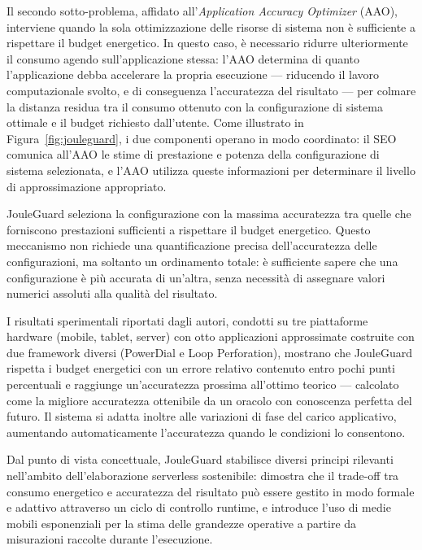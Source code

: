 Il secondo sotto-problema, affidato all'\emph{Application Accuracy
Optimizer} (AAO), interviene quando la sola ottimizzazione delle risorse
di sistema non è sufficiente a rispettare il budget energetico. In
questo caso, è necessario ridurre ulteriormente il consumo agendo
sull'applicazione stessa: l'AAO determina di quanto l'applicazione
debba accelerare la propria esecuzione --- riducendo il lavoro
computazionale svolto, e di conseguenza l'accuratezza del risultato ---
per colmare la distanza residua tra il consumo ottenuto con la
configurazione di sistema ottimale e il budget richiesto dall'utente.
Come illustrato in Figura~\ref{fig:jouleguard}, i due componenti
operano in modo coordinato: il SEO comunica all'AAO le stime di
prestazione e potenza della configurazione di sistema selezionata, e
l'AAO utilizza queste informazioni per determinare il livello di
approssimazione appropriato.

JouleGuard seleziona la configurazione con la massima accuratezza tra
quelle che forniscono prestazioni sufficienti a rispettare il budget
energetico. Questo meccanismo non richiede una quantificazione precisa
dell'accuratezza delle configurazioni, ma soltanto un ordinamento
totale: è sufficiente sapere che una configurazione è più accurata di
un'altra, senza necessità di assegnare valori numerici assoluti alla
qualità del risultato.

I risultati sperimentali riportati dagli autori, condotti su tre
piattaforme hardware (mobile, tablet, server) con otto applicazioni
approssimate costruite con due framework diversi (PowerDial e Loop
Perforation), mostrano che JouleGuard rispetta i budget energetici con
un errore relativo contenuto entro pochi punti percentuali e raggiunge
un'accuratezza prossima all'ottimo teorico --- calcolato come la
migliore accuratezza ottenibile da un oracolo con conoscenza perfetta
del futuro. Il sistema si adatta inoltre alle variazioni di fase del
carico applicativo, aumentando automaticamente l'accuratezza quando le
condizioni lo consentono.

Dal punto di vista concettuale, JouleGuard stabilisce diversi principi
rilevanti nell'ambito dell'elaborazione serverless sostenibile:
dimostra che il trade-off tra consumo energetico e accuratezza del
risultato può essere gestito in modo formale e adattivo attraverso un
ciclo di controllo runtime, e introduce l'uso di medie mobili
esponenziali per la stima delle grandezze operative a partire da
misurazioni raccolte durante l'esecuzione.

